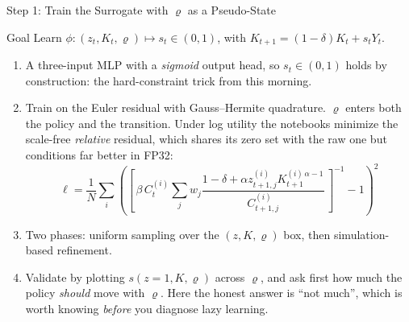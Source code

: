 \documentclass[aspectratio=169,11pt]{beamer}
\newcommand{\emphc}[1]{\textcolor{harvardcrimson}{#1}}
\newcommand{\surr}{\phi}                %
\begin{document}
\begin{frame}{Step 1: Train the Surrogate with $\varrho$ as a Pseudo-State}
\small
\begin{block}{Goal}
Learn $\surr:(z_t, K_t, \varrho) \mapsto s_t \in (0,1)$, with $K_{t+1} = (1-\delta)K_t + s_t Y_t$.
\end{block}

\begin{enumerate}\itemsep2pt
  \item A three-input MLP with a \emph{sigmoid} output head, so $s_t \in (0,1)$ holds by construction: the hard-constraint trick from this morning.
  \item Train on the Euler residual with Gauss--Hermite quadrature. \emphc{$\varrho$ enters both the policy and the transition.} Under log utility the notebooks minimize the scale-free \emph{relative} residual, which shares its zero set with the raw one but conditions far better in FP32:
  {\footnotesize\[
  \ell = \frac{1}{N}\sum_i \left(
  \left[\, \beta\, C^{(i)}_t \sum_j w_j \frac{1 - \delta + \alpha z^{(i)}_{t+1,j} K^{(i)\,\alpha-1}_{t+1}}{C^{(i)}_{t+1,j}} \,\right]^{-1} \!\!- 1 \right)^{\!2}
  \]}
  \vspace{-10pt}
  \item Two phases: uniform sampling over the $(z, K, \varrho)$ box, then simulation-based refinement.
  \item Validate by plotting $s(z\!=\!1, K, \varrho)$ across $\varrho$, and ask first how much the policy \emph{should} move with $\varrho$. Here the honest answer is ``not much'', which is worth knowing \emph{before} you diagnose lazy learning.
\end{enumerate}
\end{frame}
\end{document}
